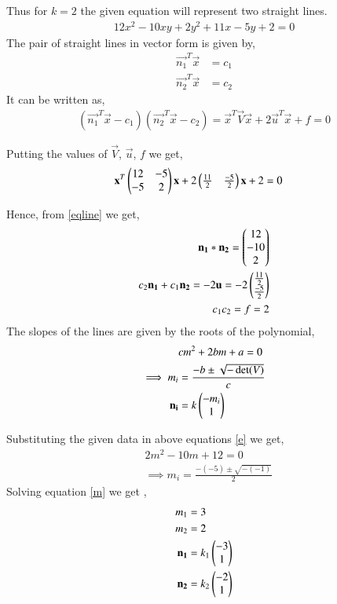 \documentclass[journal,12pt,twocolumn]{IEEEtran}
\begin{document}
Thus for $k = 2$ the given equation will represent two straight lines.
\begin{align}
12x^2-10xy+2y^2+11x-5y+2 = 0 \label{eq:op1}
\end{align}
The pair of straight lines in vector form is given by, 
\begin{align}
    \vec{n_1}^T\vec{x}&=c_1\label{m1}\\
    \vec{n_2}^T\vec{x}&=c_2\label{m2}
\end{align}
It can be written as, 
\begin{align}
    (\vec{n_1}^T\vec{x}-c_1)(\vec{n_2}^T\vec{x}-c_2)
    = \vec{x}^T\vec{V}\vec{x}+2\vec{u}^T\vec{x}+f=0
\end{align}

Putting the values of $\vec{V}$, $\vec{u}$, $f$ we get,
\begin{align}
\mathbf{x}^T\begin{pmatrix}12 & -5\\ -5 & 2\end{pmatrix}\mathbf{x}+2\begin{pmatrix}\frac{11}{2} & \frac{-5}{2}\end{pmatrix}\mathbf{x} + 2 &=0\label{eqline}
\end{align}

Hence, from \eqref{eqline} we get,
\begin{align}
\mathbf{n_1}*\mathbf{n_2}=  \begin{pmatrix}12 \\ -10 \\ 2\end{pmatrix}\label{conv}\\
c_2\mathbf{n_1}+c_1\mathbf{n_2} = -2\mathbf{u} =  -2\begin{pmatrix}\frac{11}{2}\\ \frac{-5}{2}\end{pmatrix} \label{eqc1c2}\\
c_1c_2 = f = 2
\end{align}
The slopes of the lines are given by the roots of the polynomial,
\begin{align}
    &cm^2+2bm+a=0\label{e}\\
    \implies m_i&=\frac{-b\pm{\sqrt{-\det(V)}}}{c}\\
    \mathbf{n_i}&=k\begin{pmatrix}-m_i\\1\end{pmatrix}
\end{align}

Substituting the given data in above equations \eqref{e} we get,
\begin{align}
    &2m^2 -10m + 12 = 0\\
    &\implies m_i = \frac{-(-5)\pm{\sqrt{-(-1)}}}{2}\label{m}
\end{align}
Solving equation \eqref{m} we get ,
\begin{align}
    m_1&= 3 \\
    m_2&= 2 \\
    \mathbf{n_1}&=k_1\begin{pmatrix}-3 \\ 1\end{pmatrix}\label{n1}\\
    \mathbf{n_2}&=k_2\begin{pmatrix}-2 \\ 1\end{pmatrix}\label{n2}
\end{align}
\end{document}
